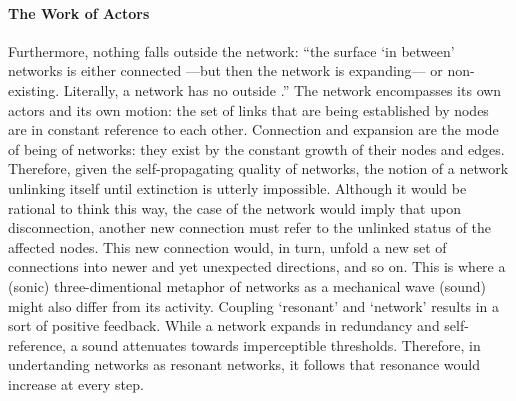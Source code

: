 \paragraph{The Work of Actors}
Furthermore, nothing falls outside the network: ``the surface `in between' networks is either connected ---but then the network is expanding--- or non-existing. Literally, a network has no outside \parencite[6]{Lat90:On}.'' The network encompasses its own actors and its own motion: the set of links that are being established by nodes are in constant reference to each other. Connection and expansion are the mode of being of networks: they exist by the constant growth of their nodes and edges. Therefore, given the self-propagating quality of networks, the notion of a network unlinking itself until extinction is utterly impossible. Although it would be rational to think this way, the case of the network would imply that upon disconnection, another new connection must refer to the unlinked status of the affected nodes. This new connection would, in turn, unfold a new set of connections into newer and yet unexpected directions, and so on. This is where a (sonic) three-dimentional metaphor of networks as a mechanical wave (sound) might also differ from its activity. Coupling `resonant' and `network' results in a sort of positive feedback. While a network expands in redundancy and self-reference, a sound attenuates towards imperceptible thresholds. Therefore, in undertanding networks as resonant networks, it follows that resonance would increase at every step. 


